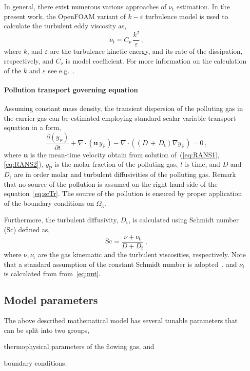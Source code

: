 In general, there exist numerous various approaches of $\nu_{\mathrm{t}}$ estimation. In the present work, the OpenFOAM variant of $k-\varepsilon$ turbulence model is used to calculate the turbulent eddy viscosity as,
\begin{equation}
    \label{eq:nut}
    \nu_{\mathrm{t}} = C_{\nu}\,\frac{k^2}{\varepsilon}\,,
\end{equation}
where $k$, and $\varepsilon$ are the turbulence kinetic energy, and its rate of the dissipation, respectively, and $C_{\nu}$ is model coefficient. For more information on the calculation of the $k$ and $\varepsilon$ see e.g.~\cite{moukalled16,launder1974}.

\paragraph{Pollution transport governing equation} Assuming constant mass density, the transient dispersion of the polluting gas in the carrier gas can be estimated employing standard scalar variable transport equation in a form,
\begin{equation}
    \label{eq:scTr}
    \frac{\partial (y_{\mathrm{P}})}{\partial t} + \nabla\cdot(\bm{u}\, y_{\mathrm{P}}) - \nabla\cdot((D\,+\,D_{\mathrm{t}}) \nabla y_{\mathrm{P}}) = 0\,,
\end{equation}
where $\bm{u}$ is the mean-time velocity obtain from solution of~(\ref{eq:RANS1},\ref{eq:RANS2}), $y_{\mathrm{P}}$ is the molar fraction of the polluting gas, $t$ is time, and $D$ and $D_{\mathrm{t}}$ are in order molar and turbulent diffusivities of the polluting gas. Remark that no source of the pollution is assumed on the right hand side of the equation~\eqref{eq:scTr}. The source of the pollution is ensured by proper application of the boundary conditions on $\Omega_{\mathrm{g}}$.

Furthermore, the turbulent diffusivity, $D_{\mathrm{t}}$, is calculated using Schmidt number (Sc) defined as, 
\begin{equation}
    \label{eq:Sc}
    \mathrm{Sc} = \frac{\nu + \nu_{\mathrm{t}}}{D + D_{t}}\,,
\end{equation}
where $\nu, \nu_{\mathrm{t}}$ are the gas kinematic and the turbulent viscosities, respectively. Note that a standard assumption of the constant Schmidt number is adopted~\cite{baik03}, and $\nu_{\mathrm{t}}$ is calculated from from~\eqref{eq:nut}.

\subsection{Model parameters}
\label{subsec:modPars}
The above described mathematical model has several tunable parameters that can be split into two groups,
\begin{inparaenum}[(i)]
    \item thermophysical parameters of the flowing gas, and
    \item boundary conditions.
\end{inparaenum}

